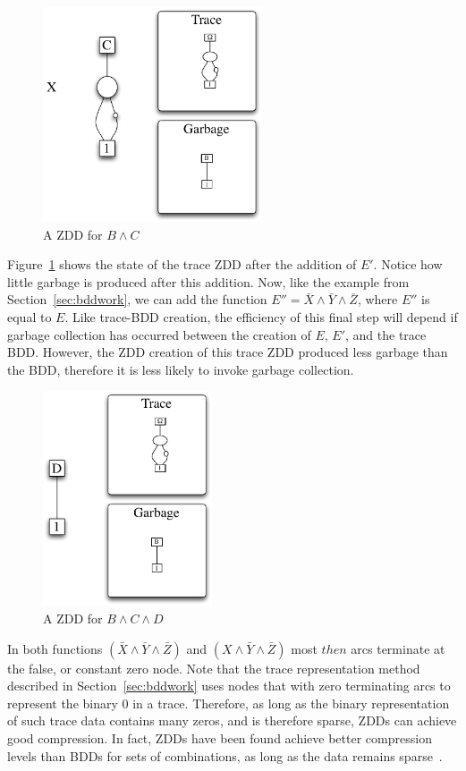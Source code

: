\documentclass[defaultstyle,11pt]{thesis}
\begin{document}
\begin{figure}
  \centering
  \includegraphics[height=2.5in]{figures/zddtrace03}
  \caption{A ZDD for $B \land C$}
  \label{fig:zddtrace03}
\end{figure}

Figure~\ref{fig:zddtrace03} shows the state of the trace ZDD after the
addition of $E'$.  Notice how little garbage is produced after this
addition.  Now, like the example from Section~\ref{sec:bddwork}, we can
add the function $E''=\bar{X}\land\bar{Y}\land\bar{Z}$, where $E''$ is
equal to $E$.  Like trace-BDD creation, the efficiency of this final
step will depend if garbage collection has occurred between the
creation of $E$, $E'$, and the trace BDD.  However, the ZDD creation
of this trace ZDD produced less garbage than the BDD, therefore it is
less likely to invoke garbage collection.

\begin{figure}
  \centering \includegraphics[height=2.5in]{figures/zddtrace04}
  \caption{A ZDD for $B \land C \land D$}
  \label{fig:zddtrace04}
\end{figure}

In both functions $(\bar{X}\land\bar{Y}\land\bar{Z})$ and
$(X\land\bar{Y}\land\bar{Z})$ most $then$ arcs terminate at the false,
or constant zero node. Note that the trace representation method
described in Section~\ref{sec:bddwork} uses nodes that with zero
terminating arcs to represent the binary $0$ in a trace.  Therefore, as
long as the binary representation of such trace data contains many
zeros, and is therefore sparse, ZDDs can achieve good compression.
In fact, ZDDs have been found achieve better compression
levels than BDDs for sets of combinations, as long as the data remains
sparse~\cite{minato:01:STTT}.
\end{document}
